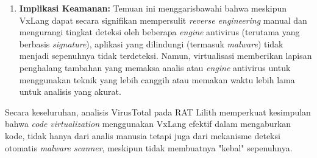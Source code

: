 \begin{enumerate}
    \item \textbf{Implikasi Keamanan:} Temuan ini menggarisbawahi bahwa meskipun VxLang dapat secara signifikan mempersulit \textit{reverse engineering} manual dan mengurangi tingkat deteksi oleh beberapa \textit{engine} antivirus (terutama yang berbasis \textit{signature}), aplikasi yang dilindungi (termasuk \textit{malware}) tidak menjadi sepenuhnya tidak terdeteksi. Namun, virtualisasi memberikan lapisan penghalang tambahan yang memaksa analis atau \textit{engine} antivirus untuk menggunakan teknik yang lebih canggih atau memakan waktu lebih lama untuk analisis yang akurat.
\end{enumerate}

Secara keseluruhan, analisis VirusTotal pada RAT Lilith memperkuat kesimpulan bahwa \textit{code virtualization} menggunakan VxLang efektif dalam mengaburkan kode, tidak hanya dari analis manusia tetapi juga dari mekanisme deteksi otomatis \textit{malware scanner}, meskipun tidak membuatnya "kebal" sepenuhnya.
